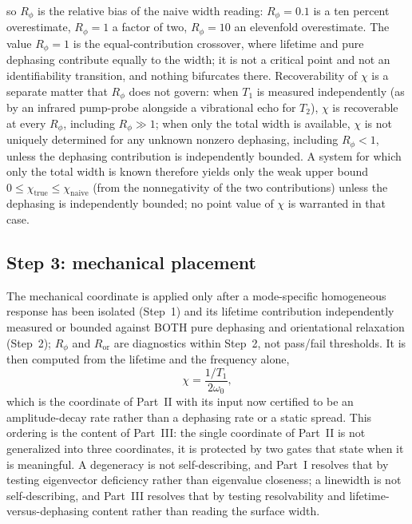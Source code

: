 so $R_\phi$ is the relative bias of the naive width reading: $R_\phi = 0.1$ is a ten percent overestimate, $R_\phi = 1$ a factor of two, $R_\phi = 10$ an elevenfold overestimate. The value $R_\phi = 1$ is the equal-contribution crossover, where lifetime and pure dephasing contribute equally to the width; it is not a critical point and not an identifiability transition, and nothing bifurcates there. Recoverability of $\chi$ is a separate matter that $R_\phi$ does not govern: when $T_1$ is measured independently (as by an infrared pump-probe alongside a vibrational echo for $T_2$), $\chi$ is recoverable at every $R_\phi$, including $R_\phi \gg 1$; when only the total width is available, $\chi$ is not uniquely determined for any unknown nonzero dephasing, including $R_\phi < 1$, unless the dephasing contribution is independently bounded. A system for which only the total width is known therefore yields only the weak upper bound $0 \le \chi_{\mathrm{true}} \le \chi_{\mathrm{naive}}$ (from the nonnegativity of the two contributions) unless the dephasing is independently bounded; no point value of $\chi$ is warranted in that case.

\subsection{Step 3: mechanical placement}

The mechanical coordinate is applied only after a mode-specific homogeneous response has been isolated (Step~1) and its lifetime contribution independently measured or bounded against BOTH pure dephasing and orientational relaxation (Step~2); $R_\phi$ and $R_{\mathrm{or}}$ are diagnostics within Step~2, not pass/fail thresholds. It is then computed from the lifetime and the frequency alone,
\begin{equation}
\chi = \frac{1/T_1}{2\omega_0},
\end{equation}
which is the coordinate of Part~II with its input now certified to be an amplitude-decay rate rather than a dephasing rate or a static spread. This ordering is the content of Part~III: the single coordinate of Part~II is not generalized into three coordinates, it is protected by two gates that state when it is meaningful. A degeneracy is not self-describing, and Part~I resolves that by testing eigenvector deficiency rather than eigenvalue closeness; a linewidth is not self-describing, and Part~III resolves that by testing resolvability and lifetime-versus-dephasing content rather than reading the surface width.
